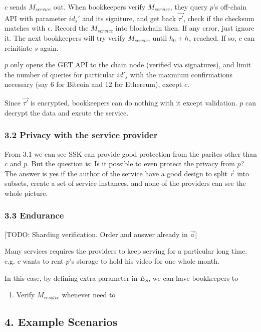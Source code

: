\documentclass[11pt]{article}
\providecommand{\tightlist}{%
      \setlength{\itemsep}{0pt}\setlength{\parskip}{0pt}}
\begin{document}
\(c\) sends \(M_{service}\) out. When bookkeepers verify
\(M_{service}\), they query \(p\)'s off-chain API with parameter
\(id_s'\) and its signiture, and get back \(\vec{\tau'}\), check if the
checksum matches with \(\epsilon\). Record the \(M_{service}\) into
blockchain then. If any error, just ignore it. The next bookkeepers will
try verify \(M_{service}\) until \(h_0+ h_e\) reached. If so, \(c\) can
reinitiate \(s\) again.

\(p\) only opens the GET API to the chain node (verified via
signatures), and limit the number of queries for particular \(id'_s\)
with the maxmium confirmations necessary (say 6 for Bitcoin and 12 for
Ethereum), except \(c\).

Since \(\vec{\tau'}\) is encrypted, bookkeepers can do nothing with it
except validation. \(p\) can decrypt the data and excute the service.

\subsubsection{3.2 Privacy with the service
provider}\label{privacy-with-the-service-provider}

From 3.1 we can see SSK can provide good protection from the parites
other than \(c\) and \(p\). But the question is: Is it possible to even
protect the privacy from \(p\)? The answer is yes if the author of the
service have a good design to split \(\vec{r}\) into subsets, create a
set of service instances, and none of the providers can see the whole
picture.

\subsubsection{3.3 Endurance}\label{endurance}

{[}TODO: Sharding verification. Order and answer already in
\(\vec{a}\){]}

Many services requires the providers to keep serving for a particular
long time. e.g. \(c\) wants to rent \(p\)'s storage to hold his video
for one whole month.

In this case, by defining extra parameter in \(E_S\), we can have
bookkeepers to

\begin{enumerate}
\def\labelenumi{\arabic{enumi}.}
\tightlist
\item
  Verify \(M_{resolve}\) whenever need to
\end{enumerate}

\subsection{4. Example Scenarios}\label{example-scenarios}
\end{document}
